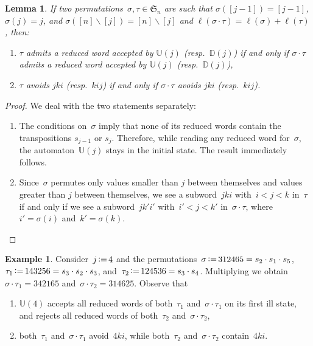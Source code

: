 \documentclass[11pt]{article}
\newtheorem{lemma}[theo]{Lemma}
\theoremstyle{definition}
\newtheorem{example}[theo]{Example}
\numberwithin{equation}{section}
\newcommand{\fS}{\mathfrak{S}}
\newcommand{\ssm}{\smallsetminus}
\newcommand{\eqdef}{\mbox{\,\raisebox{0.2ex}{\scriptsize\ensuremath{\mathrm:}}\ensuremath{=}\,}}
\newcommand{\automatonU}{\mathbb{U}}
\newcommand{\automatonD}{\mathbb{D}}
\newcommand{\length}{\ell}
\begin{document}
\begin{lemma}\label{lem:vincent2}
If two permutations~$\sigma, \tau \in \fS_n$ are such that $\sigma([j-1]) = [j-1]$, $\sigma(j) = j$, and $\sigma([n]\ssm [j]) = [n]\ssm [j]$ and $\length(\sigma \cdot \tau) = \length(\sigma) + \length(\tau)$, then:
\begin{enumerate}
	\item $\tau$ admits a reduced word accepted by $\automatonU(j)$ (resp.~$\automatonD(j)$) if and only if $\sigma \cdot \tau$ admits a reduced word accepted by $\automatonU(j)$ (resp.~$\automatonD(j)$),
	\item $\tau$ avoids $jki$ (resp.~$kij$) if and only if $\sigma \cdot \tau$ avoids $jki$ (resp.~$kij$).
\end{enumerate}
\end{lemma}

\begin{proof}
We deal with the two statements separately:
\begin{enumerate} 
	\item The conditions on~$\sigma$ imply that none of its reduced words contain the transpositions $s_{j-1}$ or $s_j$. Therefore, while reading any reduced word for~$\sigma$, the automaton~$\automatonU(j)$ stays in the initial state. The result immediately follows.
	\item Since~$\sigma$ permutes only values smaller than $j$ between themselves and values greater than $j$ between themselves, we see a subword~$jki$ with~$i < j < k$ in~$\tau$ if and only if we see a subword~$jk'i'$ with~$i' < j < k'$ in~$\sigma \cdot \tau$, where~$i' = \sigma(i)$ and~$k' = \sigma(k)$.
	\qedhere
\end{enumerate}
\end{proof}

\begin{example}\label{exm:lemVincent2}
Consider~$j \eqdef 4$ and the permutations~$\sigma \eqdef 312465 = s_2 \cdot s_1 \cdot s_5$, $\tau_1 \eqdef 143256 = s_3 \cdot s_2 \cdot s_3$, and~$\tau_2 \eqdef 124536 = s_3 \cdot s_4$.
Multiplying we obtain~$\sigma\cdot\tau_1=342165$ and~$\sigma\cdot\tau_2 = 314625$. Observe that
\begin{enumerate}
	\item $\automatonU(4)$ accepts all reduced words of both~$\tau_1$ and~$\sigma\cdot \tau_1$ on its first ill state, and rejects all reduced words of both~$\tau_2$ and~$\sigma\cdot \tau_2$,
	\item both~$\tau_1$ and~$\sigma\cdot\tau_1$ avoid~$4ki$, while both~$\tau_2$ and~$\sigma\cdot\tau_2$ contain~$4ki$.
\end{enumerate}
\end{example}
\end{document}
